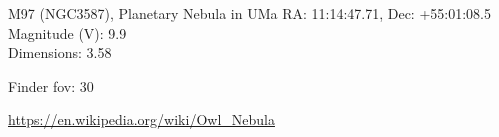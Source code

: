 \begin{block}{M97 (NGC3587), Planetary Nebula in UMa}
    RA: 11:14:47.71, Dec: +55:01:08.5 \\ 
    Magnitude (V): 9.9 \\ 
    Dimensions: 3.58 

    Finder fov: 30 

    \url{https://en.wikipedia.org/wiki/Owl_Nebula} 
\end{block}